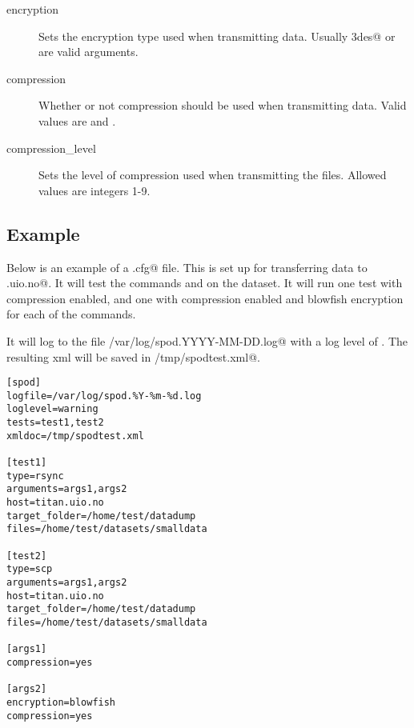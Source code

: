 \begin{description}
    \item[encryption]   Sets the encryption type used when transmitting data.
        Usually \verb@3des@ or \verb@blowfish@ are valid arguments.
    \item[compression]  Whether or not compression should be used when
        transmitting data. Valid values are \verb@yes@ and \verb@no@.
    \item[compression\_level]   Sets the level of compression used when
        transmitting the files. Allowed values are integers 1-9.
\end{description}

\newpage
\subsection{Example}

Below is an example of a \verb@spodconf.cfg@ file. This is set up for
transferring data to \verb@titan.uio.no@. It will test the commands
\verb@rsync@ and \verb@scp@ on the \verb@smalldata@ dataset. It will run one
test with compression enabled, and one with compression enabled and blowfish
encryption for each of the commands. 

It will log to the file \verb@/var/log/spod.YYYY-MM-DD.log@ with a log level of
\verb@warning@. The resulting \gls{xml} will be saved in
\verb@/tmp/spodtest.xml@. 

\begin{verbatim}
[spod]
logfile=/var/log/spod.%Y-%m-%d.log
loglevel=warning
tests=test1,test2
xmldoc=/tmp/spodtest.xml

[test1]
type=rsync
arguments=args1,args2
host=titan.uio.no
target_folder=/home/test/datadump
files=/home/test/datasets/smalldata

[test2]
type=scp
arguments=args1,args2
host=titan.uio.no
target_folder=/home/test/datadump
files=/home/test/datasets/smalldata

[args1]
compression=yes

[args2]
encryption=blowfish
compression=yes

\end{verbatim}
